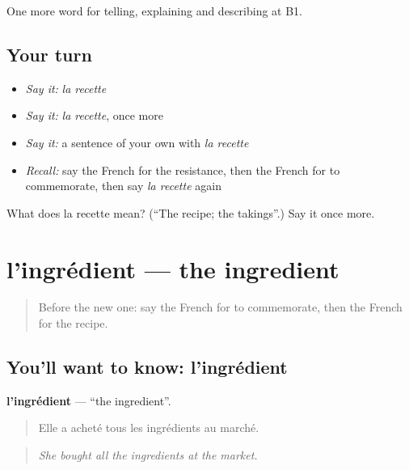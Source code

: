 \begin{grammarlens}[title={What you've built}]
One more word for telling, explaining and describing at B1.
\end{grammarlens}

\subsection*{Your turn}
\begin{itemize}
\raggedright
  \item \emph{Say it:} \emph{la recette}
  \item \emph{Say it:} \emph{la recette}, once more
  \item \emph{Say it:} a sentence of your own with \emph{la recette}
  \item \emph{Recall:} say the French for the resistance, then the French for to commemorate, then say \emph{la recette} again
\end{itemize}

\begin{tcolorbox}[breakable,colback=teal!4,colframe=teal!35!black,title={Before you move on}]
What does la recette mean? (\textquotedblleft{}The recipe; the takings\textquotedblright{}.) Say it once more.
\end{tcolorbox}
\section[l'ingrédient]{l'ingrédient — the ingredient}

\label{lesson:FR-C327-ingredient}



\begin{quote}
Before the new one: say the French for to commemorate, then the French for the recipe.
\end{quote}

\subsection*{You'll want to know: l'ingrédient}
\textbf{l'ingrédient} — \textquotedblleft{}the ingredient\textquotedblright{}.

\begin{quote}
Elle a acheté tous les ingrédients au marché.
\end{quote}

\begin{quote}
\emph{She bought all the ingredients at the market.}
\end{quote}

